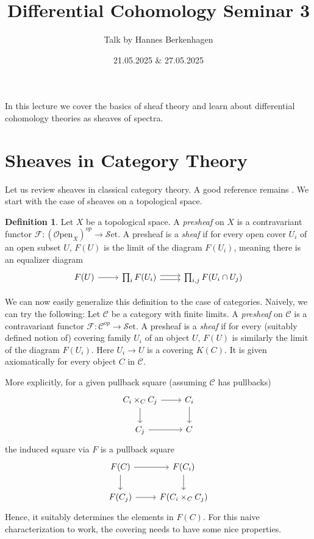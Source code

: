 \documentclass[10pt]{amsart}
\title{Differential Cohomology Seminar 3}
\date{21.05.2025 $\&$ 27.05.2025}
\author{Talk by Hannes Berkenhagen}
\newcommand{\C}{\mathscr{C}}
\newcommand{\set}{\mathscr{S}\mathrm{et}}
\newcommand{\Open}{\mathscr{O}\mathrm{pen}}
\theoremstyle{definition}
\newtheorem{definition}[equation]{Definition}
\theoremstyle{remark}
\begin{document}
\maketitle

In this lecture we cover the basics of sheaf theory and learn about differential cohomology theories as sheaves of spectra. 

\section{Sheaves in Category Theory}
Let us review sheaves in classical category theory. A good reference remains \cite{maclanemoerdijk1994topos}. We start with  the case of sheaves on a topological space. 

\begin{definition}
  Let $X$ be a topological space. A \emph{presheaf} on $X$ is a contravariant functor $\mathscr{F} : (\Open_X)^{op} \to \set$. A presheaf is a \emph{sheaf} if for every open cover $U_i$ of an open subset $U$, $F(U)$ is the limit of the diagram $F(U_i)$, meaning there is an equalizer diagram 
  \[
    \begin{tikzcd}
      F(U) \arrow[r] & \prod_i F(U_i) \arrow[r, shift left=1] \arrow[r, shift right = 1] &   \prod_{i,j} F(U_i \cap U_j) 
    \end{tikzcd}
  \]
\end{definition}

We can now easily generalize this definition to the case of categories. Naively, we can try the following: Let $\C$ be a category with finite limits. A \emph{presheaf} on $\C$ is a contravariant functor $\mathscr{F} : \C^{op} \to \set$. A presheaf is a \emph{sheaf} if for every (suitably defined notion of) covering family $U_i$ of an object $U$, $F(U)$ is similarly the limit of the diagram $F(U_i)$. Here $U_i \to U$ is a covering $K(C)$. It is given axiomatically for every object $C$ in $\C$.

More explicitly, for a given pullback square (assuming $\C$ has pullbacks) 
\[
  \begin{tikzcd} 
    C_i \times_{C} C_j \arrow[r] \arrow[d] & C_i \arrow[d] \\
    C_j \arrow[r] & C
\end{tikzcd}
\]
the induced square via $F$ is a pullback square
\[
  \begin{tikzcd} 
    F(C) \arrow[r] \arrow[d] & F(C_i) \arrow[d] \\
    F(C_j) \arrow[r] & F(C_i \times_{C} C_j)
\end{tikzcd}
\]
Hence, it suitably determines the elements in $F(C)$. For this naive characterization to work, the covering needs to have some nice properties.
\end{document}
